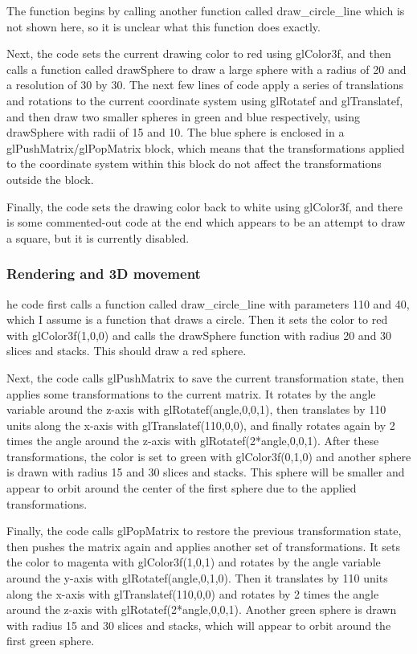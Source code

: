\documentclass[12pt,a4]{article}
\begin{document}
{The function begins by calling another function called draw\_circle\_line which is not shown here, so it is unclear what this function does exactly.

Next, the code sets the current drawing color to red using glColor3f, and then calls a function called drawSphere to draw a large sphere with a radius of 20 and a resolution of 30 by 30. The next few lines of code apply a series of translations and rotations to the current coordinate system using glRotatef and glTranslatef, and then draw two smaller spheres in green and blue respectively, using drawSphere with radii of 15 and 10. The blue sphere is enclosed in a glPushMatrix/glPopMatrix block, which means that the transformations applied to the coordinate system within this block do not affect the transformations outside the block.

Finally, the code sets the drawing color back to white using glColor3f, and there is some commented-out code at the end which appears to be an attempt to draw a square, but it is currently disabled.
\newpage
\subsubsection{Rendering and 3D movement}
he code first calls a function called draw\_circle\_line with parameters 110 and 40, which I assume is a function that draws a circle. Then it sets the color to red with glColor3f(1,0,0) and calls the drawSphere function with radius 20 and 30 slices and stacks. This should draw a red sphere.

Next, the code calls glPushMatrix to save the current transformation state, then applies some transformations to the current matrix. It rotates by the angle variable around the z-axis with glRotatef(angle,0,0,1), then translates by 110 units along the x-axis with glTranslatef(110,0,0), and finally rotates again by 2 times the angle around the z-axis with glRotatef(2*angle,0,0,1). After these transformations, the color is set to green with glColor3f(0,1,0) and another sphere is drawn with radius 15 and 30 slices and stacks. This sphere will be smaller and appear to orbit around the center of the first sphere due to the applied transformations.

Finally, the code calls glPopMatrix to restore the previous transformation state, then pushes the matrix again and applies another set of transformations. It sets the color to magenta with glColor3f(1,0,1) and rotates by the angle variable around the y-axis with glRotatef(angle,0,1,0). Then it translates by 110 units along the x-axis with glTranslatef(110,0,0) and rotates by 2 times the angle around the z-axis with glRotatef(2*angle,0,0,1). Another green sphere is drawn with radius 15 and 30 slices and stacks, which will appear to orbit around the first green sphere.

}
\end{document}
